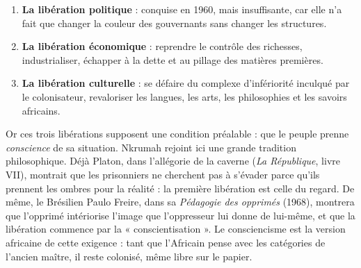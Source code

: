\documentclass[11pt]{article}
\begin{document}
\begin{enumerate}
\item \textbf{La libération politique} : conquise en 1960, mais insuffisante, car elle n'a fait que changer la couleur des gouvernants sans changer les structures.
\item \textbf{La libération économique} : reprendre le contrôle des richesses, industrialiser, échapper à la dette et au pillage des matières premières.
\item \textbf{La libération culturelle} : se défaire du complexe d'infériorité inculqué par le colonisateur, revaloriser les langues, les arts, les philosophies et les savoirs africains.
\end{enumerate}

Or ces trois libérations supposent une condition préalable : que le peuple prenne \emph{conscience} de sa situation. Nkrumah rejoint ici une grande tradition philosophique. Déjà Platon, dans l'allégorie de la caverne (\emph{La République}, livre VII), montrait que les prisonniers ne cherchent pas à s'évader parce qu'ils prennent les ombres pour la réalité : la première libération est celle du regard. De même, le Brésilien Paulo Freire, dans sa \emph{Pédagogie des opprimés} (1968), montrera que l'opprimé intériorise l'image que l'oppresseur lui donne de lui-même, et que la libération commence par la « conscientisation ». Le consciencisme est la version africaine de cette exigence : tant que l'Africain pense avec les catégories de l'ancien maître, il reste colonisé, même libre sur le papier.
\end{document}
